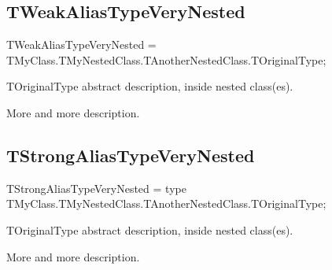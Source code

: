 \documentclass{report}
\begin{document}
\subsection*{TWeakAliasTypeVeryNested}
\begin{list}{}{
\setlength{\itemindent}{0cm}
\setlength{\listparindent}{0cm}
\setlength{\leftmargin}{\evensidemargin}
\addtolength{\leftmargin}{\tmplength}
\settowidth{\labelsep}{X}
\addtolength{\leftmargin}{\labelsep}
\setlength{\labelwidth}{\tmplength}
}
\begin{flushleft}
\item[\textbf{Declaration}\hfill]
\begin{ttfamily}
TWeakAliasTypeVeryNested = TMyClass.TMyNestedClass.TAnotherNestedClass.TOriginalType;\end{ttfamily}


\end{flushleft}
\par
\item[\textbf{Description}]
TOriginalType abstract description, inside nested class(es).\hfill\vspace*{1ex}

 More and more description.

\end{list}
\subsection*{TStrongAliasTypeVeryNested}
\begin{list}{}{
\setlength{\itemindent}{0cm}
\setlength{\listparindent}{0cm}
\setlength{\leftmargin}{\evensidemargin}
\addtolength{\leftmargin}{\tmplength}
\settowidth{\labelsep}{X}
\addtolength{\leftmargin}{\labelsep}
\setlength{\labelwidth}{\tmplength}
}
\begin{flushleft}
\item[\textbf{Declaration}\hfill]
\begin{ttfamily}
TStrongAliasTypeVeryNested = type TMyClass.TMyNestedClass.TAnotherNestedClass.TOriginalType;\end{ttfamily}


\end{flushleft}
\par
\item[\textbf{Description}]
TOriginalType abstract description, inside nested class(es).\hfill\vspace*{1ex}

 More and more description.

\end{list}
\end{document}
